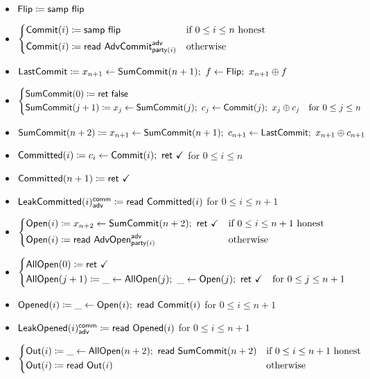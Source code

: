 \begin{itemize}
\item $\mathsf{Flip} \coloneqq \mathsf{samp} \ \mathsf{flip}$
\item {\color{blue} $\begin{cases*} \Commit(i) \coloneqq \samp{\flip} & \text{if $0 \leq i \leq n$ honest} \\ \Commit(i) \coloneqq \read{\AdvCommit^\adv_{\party(i)}} & \text{otherwise} \end{cases*}$}
\item {\color{blue} $\mathsf{LastCommit} \coloneqq x_{n+1} \leftarrow \mathsf{SumCommit}(n+1); \ f \leftarrow \mathsf{Flip}; \ x_{n+1} \oplus f$}
\item {\color{blue} $\begin{cases*} \SumCommit(0) \coloneqq \ret{\false} & \\ \SumCommit(j+1) \coloneqq x_j \leftarrow \SumCommit(j); \ c_j \leftarrow \Commit(j); \ x_j \oplus c_j & \text{for $0 \leq j \leq n$} \end{cases*}$}
\item {\color{blue} $\SumCommit(n+2) \coloneqq x_{n+1} \leftarrow \SumCommit(n+1); \ c_{n+1} \leftarrow \LastCommit; \ x_{n+1} \oplus c_{n+1}$}
\item {\color{magenta} $\mathsf{Committed}(i) \coloneqq c_i \leftarrow \mathsf{Commit}(i); \ \mathsf{ret} \ \checkmark$ for $0 \leq i \leq n$}
\item {\color{magenta} $\mathsf{Committed}(n+1) \coloneqq \mathsf{ret} \ \checkmark$}
\item {\color{magenta} $\mathsf{LeakCommitted}(i)^{\mathsf{comm}}_{\mathsf{adv}} \coloneqq \mathsf{read} \ \mathsf{Committed}(i)$ for $0 \leq i \leq n+1$}
\item {\color{teal} $\begin{cases*} \Open(i) \coloneqq x_{n+2} \leftarrow \SumCommit(n+2); \ \ret{\checkmark} & \text{if $0 \leq i \leq n+1$ honest} \\ \Open(i) \coloneqq \read{\AdvOpen^\adv_{\party(i)}} & \text{otherwise} \end{cases*}$}
\item {\color{teal} $\begin{cases*} \AllOpen(0) \coloneqq \ret{\checkmark} & \\ \AllOpen(j+1) \coloneqq \_ \leftarrow \AllOpen(j); \ \_ \leftarrow \Open(j); \ \ret{\checkmark} & \text{for $0 \leq j \leq n+1$} \end{cases*}$}
\item {\color{red} $\mathsf{Opened}(i) \coloneqq \_ \leftarrow \mathsf{Open}(i); \ \mathsf{read} \ \mathsf{Commit}(i)$ for $0 \leq i \leq n+1$}
\item {\color{red} $\mathsf{LeakOpened}(i)^{\mathsf{comm}}_{\mathsf{adv}} \coloneqq \mathsf{read} \ \mathsf{Opened}(i)$ for $0 \leq i \leq n+1$}
\item $\begin{cases*} \Out(i) \coloneqq \_ \leftarrow \AllOpen(n+2); \ \read{\SumCommit(n+2)} & \text{if $0 \leq i \leq n+1$ honest} \\ \Out(i) \coloneqq \read{\Out(i)} & \text{otherwise} \end{cases*}$
\end{itemize}

